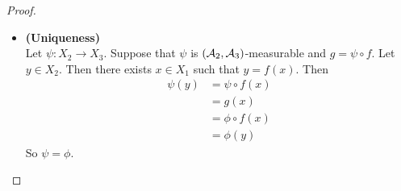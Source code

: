 \documentclass{book}
\begin{document}
\begin{proof}
\begin{itemize}
\begin{itemize}
\begin{align*}
				\end{align*}
			\end{itemize}
			Therefore, 
			\begin{itemize}
				\item for each $t \in g(X_1)$, $B_t \neq \varnothing$
				\item $(A_t)_{t \in g(X_1)}$ is a partion of $X_1$
				\item $(B_t)_{t \in g(X_1)}$ is a partition of $X_2$\\
			\end{itemize}		
			Define $\phi:X_2 \rightarrow X_3$ by $\phi(y) = t$ for $t \in g(X_1)$ and $y \in B_t $. Then the previous observations imply that $\phi$ is well defined and $\phi(X_2) = g(X_1)$. Since for each $t \in g(X_1)$ and $x \in A_t$, $f(x) \in B_t$ and $g(x) = t$, we have that $\phi \circ f (x) = t = g(x)$. So $\phi \circ f = g$. \\ \\
			To show that $\phi$ is measurable, let $C \in \MA_3$. Choose $B \in \MA_2$ such that $g^{-1}(C) = f^{-1}(B)$.
			Let $y \in \phi^{-1}(C) \subset X_2$. Set $t = \phi(y) \in C$ and choose $x \in X_1$ such that $y = f(x)$. Since 
			\begin{align*}
				g(x) 
				&= \phi \circ f (x) \\
				&= \phi(y) \\
				&= t \\
				&\in C
			\end{align*}		
			$x \in g^{-1}(C) = f^{-1}(B)$. Therefore, $y = f(x) \in B$. So $\phi^{-1}(C) \subset B$. \\
			Let $y \in B$. Choose $x \in X_1$ such that $f(x) = y$. Then $x \in f^{-1}(B) = g^{-1}(C)$. So 
			\begin{align*}
				\phi(y) 
				&= \phi \circ f (x) \\
				&= g(x) \\
				&\in C
			\end{align*}	 
			and $y \in \phi^{-1}(C)$. So $B \subset \phi^{-1}(C)$. 
			Hence $\phi^{-1}(C) = B \in \MA_2$ and $\phi$ is $(\MA_2, \MA_3)$-measurable.\\
			\item \textbf{(Uniqueness)} \\
			Let $\psi: X_2 \rightarrow X_3$. Suppose that $\psi$ is $(\MA_2, \MA_3)$-measurable and $g = \psi \circ f$. Let $y \in X_2$. Then there exists $x \in X_1$ such that $y = f(x)$. Then 
			\begin{align*}
				\psi(y) 
				&= \psi \circ f(x) \\
				&= g(x) \\
				&= \phi \circ f(x) \\
				&= \phi(y)
			\end{align*}
			So $\psi = \phi$.
		\end{itemize}
	\end{proof}
\end{document}
